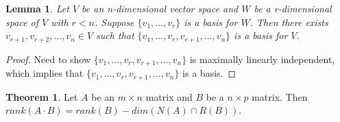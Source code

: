 \documentclass[12pt]{article}
\newtheorem*{lemma}{Lemma}
\theoremstyle{definition}
\newtheorem{theorem}{Theorem}[section]  %
\begin{document}
\begin{lemma}
Let $V$ be an n-dimensional vector space and $W$ be a r-dimensional space of $V$ with $r < n$.
Suppose $\{v_1, \ldots, v_r \}$ is a basis for $W$. Then there exists 
$v_{r +1}, v_{r + 2}, \ldots, v_n \in V$ such that
$\{v_1, \ldots, v_r, v_{r + 1}, \ldots, v_n \}$ is a basis for $V$.
\end{lemma}

\begin{proof}
Need to show $\{v_1, \ldots, v_r, v_{r + 1}, \ldots, v_n \}$ is maximally linearly independent,
which implies that $\{v_1, \ldots, v_r, v_{r + 1}, \ldots, v_n \}$ is a basis.
\end{proof}

\begin{theorem}
Let $A$ be an $m \times n$ matrix and $B$ be a $n \times p$ matrix. Then $rank(A \cdot B) = rank(B) - 
dim(N(A) \cap R(B))$.
\end{theorem}
\end{document}
